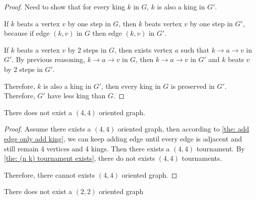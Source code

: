 \begin{proof}
  Need to show that for every king \(k\) in \(G\),
  \(k\) is also a king in \(G'\).

  If \(k\) beats a vertex \(v\) by one step in \(G\),
  then \(k\) beats vertex \(v\) by one step in \(G'\),
  because if edge \((k, v)\) in \(G\) then
  edge \((k, v)\) in \(G'\).

  If \(k\) beats a vertex \(v\) by 2 steps in \(G\),
  then exists vertex \(a\) such that
  \(k \to a \to v\) in \(G'\).
  By previous reasoning, \(k \to a \to v\) in \(G\),
  then \(k \to a \to v\) in \(G'\)
  and \(k\) beats \(v\) by 2 steps in \(G'\).

  Therefore, \(k\) is also a king in \(G'\),
  then every king in \(G\) is preserved in \(G'\).
  Therefore, \(G'\) have less king than \(G\).
\end{proof}

\begin{lemma}\label{the: no (4 4) oriented graph}
  There does not exist a \((4,4)\) oriented graph.
\end{lemma}
\begin{proof}
  Assume there exists a \((4, 4)\) oriented graph,
  then according to \cref{the: add edge only add king},
  we can keep adding edge until every edge is adjacent
  and still remain 4 vertices and 4 kings.
  Then there exists a \((4,4)\) tournament.
  By \cref{the: (n k) tournament exists},
  there do not exists \((4,4)\) tournaments.

  Therefore, there cannot exists \((4,4)\) oriented graph.
\end{proof}

\begin{lemma}\label{the: no (2 2) oriented graph}
  There does not exist a \((2, 2)\) oriented graph
\end{lemma}

